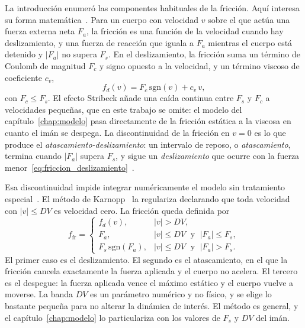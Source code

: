 La introducción enumeró las componentes habituales de la fricción. Aquí interesa su forma matemática~\cite{olsson,armstrong}. Para un cuerpo con velocidad $v$ sobre el que actúa una fuerza externa neta $F_a$, la fricción es una función de la velocidad cuando hay deslizamiento, y una fuerza de reacción que iguala a $F_a$ mientras el cuerpo está detenido y $|F_a|$ no supera $F_s$. En el deslizamiento, la fricción suma un término de Coulomb de magnitud $F_c$ y signo opuesto a la velocidad, y un término viscoso de coeficiente $c_v$,
\begin{equation}
f_d(v)=F_c\,\mathrm{sgn}(v)+c_v\,v ,
\label{eq:friccion_deslizamiento}
\end{equation}
con $F_c\le F_s$. El efecto Stribeck añade una caída continua entre $F_s$ y $F_c$ a velocidades pequeñas, que en este trabajo se omite: el modelo del capítulo~\ref{chap:modelo} pasa directamente de la fricción estática a la viscosa en cuanto el imán se despega. La discontinuidad de la fricción en $v=0$ es lo que produce el \emph{atascamiento-deslizamiento}: un intervalo de reposo, o \emph{atascamiento}, termina cuando $|F_a|$ supera $F_s$, y sigue un \emph{deslizamiento} que ocurre con la fuerza menor~\eqref{eq:friccion_deslizamiento}~\cite{berman,armstrong}.

Esa discontinuidad impide integrar numéricamente el modelo sin tratamiento especial~\cite{haessig}. El método de Karnopp~\cite{karnopp} la regulariza declarando que toda velocidad con $|v|\le DV$ es velocidad cero. La fricción queda definida por
\begin{equation}
f_{\text{fr}} =
\begin{cases}
f_d(v), & |v|>DV, \\
F_a, & |v|\le DV \;\text{ y }\; |F_a|\le F_s, \\
F_s\,\mathrm{sgn}(F_a), & |v|\le DV \;\text{ y }\; |F_a|>F_s .
\end{cases}
\label{eq:karnopp}
\end{equation}
El primer caso es el deslizamiento. El segundo es el atascamiento, en el que la fricción cancela exactamente la fuerza aplicada y el cuerpo no acelera. El tercero es el despegue: la fuerza aplicada vence el máximo estático y el cuerpo vuelve a moverse. La banda $DV$ es un parámetro numérico y no físico, y se elige lo bastante pequeña para no alterar la dinámica de interés. El método es general, y el capítulo~\ref{chap:modelo} lo particulariza con los valores de $F_s$ y $DV$ del imán.

